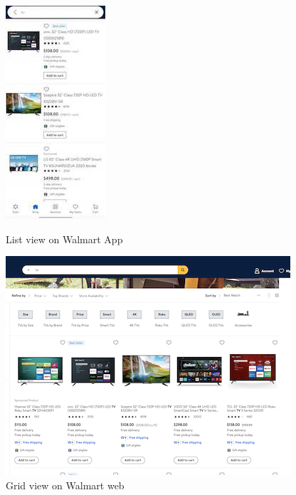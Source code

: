 \documentclass[11pt]{article}
\begin{document}
\begin{figure}[t!]
\vspace{5mm}
\hspace{-3cm}
   \centering
   \includegraphics[bb= 0 0 105 225, valign=t]{submissions/debaising_grid_search/figs/walmart_app_px.jpg}
   \caption{List view on Walmart App}
   \centering
   \includegraphics[bb= 0 0 300 188, valign=t]{submissions/debaising_grid_search/figs/walmart_web_px.png}
   \caption{Grid view on Walmart web}
\end{figure}
\end{document}
